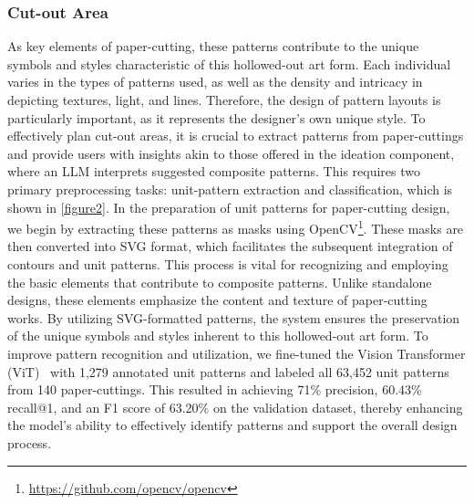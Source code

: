 \subsubsection{Cut-out Area} %
As key elements of paper-cutting, these patterns contribute to the unique symbols and styles characteristic of this hollowed-out art form. Each individual varies in the types of patterns used, as well as the density and intricacy in depicting textures, light, and lines. Therefore, the design of pattern layouts is particularly important, as it represents the designer's own unique style.
To effectively plan cut-out areas, it is crucial to extract patterns from paper-cuttings and provide users with insights akin to those offered in the ideation component, where an LLM interprets suggested composite patterns. This requires two primary preprocessing tasks: unit-pattern extraction and classification, which is shown in \autoref{figure2}.
In the preparation of unit patterns for paper-cutting design, we begin by extracting these patterns as masks using OpenCV\footnote{\url{https://github.com/opencv/opencv}}. These masks are then converted into SVG format, which facilitates the subsequent integration of contours and unit patterns. This process is vital for recognizing and employing the basic elements that contribute to composite patterns. Unlike standalone designs, these elements emphasize the content and texture of paper-cutting works. By utilizing SVG-formatted patterns, the system ensures the preservation of the unique symbols and styles inherent to this hollowed-out art form.
To improve pattern recognition and utilization, we fine-tuned the Vision Transformer (ViT)~\cite{Dosovitskiy:2021:vit} with 1,279 annotated unit patterns and labeled all 63,452 unit patterns from 140 paper-cuttings. This resulted in achieving 71\% precision, 60.43\% recall@1, and an F1 score of 63.20\% on the validation dataset, thereby enhancing the model's ability to effectively identify patterns and support the overall design process.


